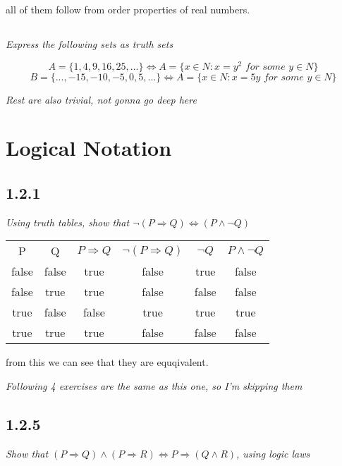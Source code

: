 \documentclass[11pt,oneside,titlepage]{book}
\DeclareMathOperator \lra {\Leftrightarrow}
\DeclareMathOperator \eqv {\Leftrightarrow}
\DeclareMathOperator \ra {\Rightarrow}
\DeclareMathOperator \imp {\Rightarrow}
\begin{document}
all of them follow from order properties of real numbers.

\subsection{}

\textit{Express the following sets as truth sets}

$$A = \{1, 4, 9, 16, 25, ...\} \iff A = \{x \in N: x = y^2 \textit{ for some } y \in N\}$$
$$B = \{..., -15, -10, -5, 0, 5, ... \} \iff A = \{x \in N: x = 5y  \textit{ for some } y \in N\}$$

\textit{Rest are also trivial, not gonna go deep here}

\section{Logical Notation}

\subsection*{1.2.1}

\textit{Using truth tables, show that $\neg(P \ra Q) \lra (P \land \neg Q)$}

\begin{center}
  \begin{tabular}{c| c| c| c| c| c|}
    P & Q & $P \ra Q$ & $\neg(P \ra Q)$ & $\neg Q$ & $P \land \neg Q$ \\
    false & false & true & false & true & false \\
    false & true & true & false & false & false \\
    true & false & false & true & true & true \\
    true & true & true & false & false & false \\
  \end{tabular}  
\end{center}

from this we can see that they are equqivalent.

\textit{Following 4 exercises are the same as this one, so I'm skipping them}

\subsection*{1.2.5}

\textit{Show that $(P \imp Q) \land (P \imp R) \eqv P \imp (Q \land R)$, using logic laws}
\end{document}
